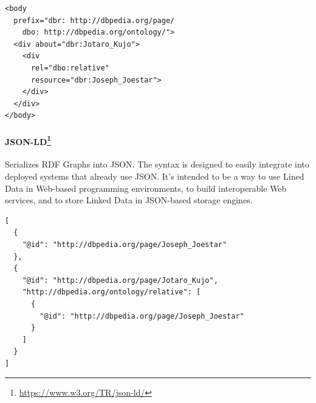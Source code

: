 \begin{verbatim}
<body
  prefix="dbr: http://dbpedia.org/page/
    dbo: http://dbpedia.org/ontology/">
  <div about="dbr:Jotaro_Kujo">
    <div
      rel="dbo:relative"
      resource="dbr:Joseph_Joestar">
    </div>
  </div>
</body>  
\end{verbatim}

\paragraph*{JSON-LD\footnote{\url{https://www.w3.org/TR/json-ld/}}} Serializes \ac{RDF} Graphs into \ac{JSON}. The syntax is designed to easily integrate into deployed systems that already use \ac{JSON}. It's intended to be a way to use Lined Data in Web-based programming environments, to build interoperable Web services, and to store Linked Data in \ac{JSON}-based storage engines.

\begin{verbatim}
[
  {
    "@id": "http://dbpedia.org/page/Joseph_Joestar"
  },
  {
    "@id": "http://dbpedia.org/page/Jotaro_Kujo",
    "http://dbpedia.org/ontology/relative": [
      {
        "@id": "http://dbpedia.org/page/Joseph_Joestar"
      }
    ]
  }
]
\end{verbatim}